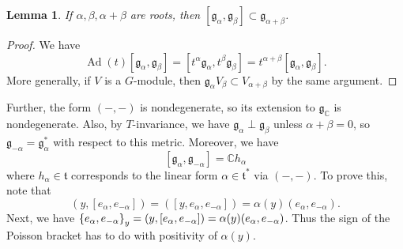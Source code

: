 \documentclass[leqno, openany]{memoir}
\newtheorem{lem}[thm]{Lemma}
\theoremstyle{definition}
\theoremstyle{remark}
\theoremstyle{plain}
\theoremstyle{definition}
\theoremstyle{remark}
\newcommand{\C}{\mathbb{C}}
\newcommand{\mf}[1]{\mathfrak{#1}}
\DeclareMathOperator{\Ad}{Ad}
\begin{document}
\begin{lem}
    If $\alpha, \beta, \alpha + \beta$ are roots, then $[\mf{g}_{\alpha}, \mf{g}_{\beta}] \subset \mf{g}_{\alpha + \beta}$.
\end{lem}

\begin{proof}
    We have
    \[ \Ad(t) [\mf{g}_{\alpha}, \mf{g}_{\beta}] = [t^{\alpha }\mf{g}_{\alpha}, t^{\beta} \mf{g}_{\beta}] = t^{\alpha + \beta} [\mf{g}_{\alpha}, \mf{g}_{\beta}]. \]
    More generally, if $V$ is a $G$-module, then $\mf{g}_{\alpha} V_{\beta} \subset V_{\alpha + \beta}$ by the same argument.
\end{proof}

Further, the form $(-,-)$ is nondegenerate, so its extension to $\mf{g}_{\C}$ is nondegenerate. Also, by $T$-invariance, we have $\mf{g}_{\alpha} \perp \mf{g}_{\beta}$ unless $\alpha + \beta = 0$, so $\mf{g}_{-\alpha} = \mf{g}_{\alpha}^*$ with respect to this metric. Moreover, we have 
\[ [\mf{g}_{\alpha}, \mf{g}_{-\alpha}] = \C h_{\alpha} \]
where $h_{\alpha} \in \mf{t}$ corresponds to the linear form $\alpha \in \mf{t}^*$ via $(-,-)$. To prove this, note that
\[ (y, [e_{\alpha}, e_{-\alpha}]) = ([y, e_{\alpha}, e_{-\alpha}]) = \alpha(y) (e_{\alpha}, e_{-\alpha}). \]
Next, we have $\qty{e_{\alpha}, e_{-\alpha}}_y = (y, [e_{\alpha}, e_{-\alpha}]) = \alpha(y) (e_{\alpha}, e_{-\alpha})$. Thus the sign of the Poisson bracket has to do with positivity of $\alpha(y)$.
\end{document}
